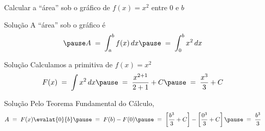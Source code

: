 \begin{question}
  Calcular a ``área'' sob o gráfico de \(f(x)=x^2\) entre 0 e $b$
\end{question}

\begin{resolution}{Solução}
  A ``área'' sob o gráfico é
  \[
    \pause
    A
    \;=\; \int_a^b f(x) \,dx
    \pause
    \;=\; \int_0^b x^2  \,dx
  \]
\end{resolution}

\begin{resolution}{Solução}
  Calculamos a primitiva de $f(x)=x^2$
  \[
    F(x)
    \;=\; \int x^2 \,dx
    \pause
    \;=\; \frac{x^{2+1}}{2+1} + C
    \pause
    \;=\; \frac{x^3}{3} + C
  \]
\end{resolution}

\begin{resolution}{Solução}
  Pelo Teorema Fundamental do Cálculo,
  \[
    A
    \;=\; F(x) \evalat{0}{b}
    \pause
    \;=\; F(b) - F(0)
    \pause
    \;=\; \left[ \frac{b^3}{3} + C \right]
      -   \left[ \frac{0^3}{3} + C \right]
    \pause
    \;=\; \frac{b^3}{3}
  \]
\end{resolution}

